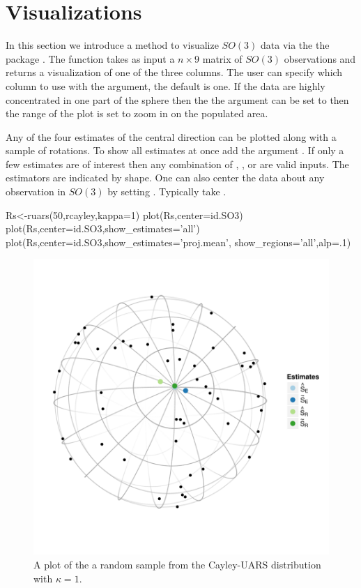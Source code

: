 \section{Visualizations}
In this section we introduce a method to visualize $SO(3)$ data via the the  package \citep{wickham2009}.  The function  takes as input a $n\times 9$ matrix of $SO(3)$ observations and returns a visualization of one of the three columns.  The user can specify which column to use with the  argument, the default is one.  If the data are highly concentrated in one part of the sphere then the the  argument can be set to  then the range of the plot is set to zoom in on the populated area. 

Any of the four estimates of the central direction can be plotted along with a sample of rotations. To show all estimates at once add the argument .  If only a few estimates are of interest then any combination of , ,  or  are valid inputs.  The estimators are indicated by shape.  One can also center the data about any observation in $SO(3)$ by setting .   Typically take .  

\begin{example}
Rs<-ruars(50,rcayley,kappa=1)
plot(Rs,center=id.SO3)
plot(Rs,center=id.SO3,show_estimates='all')
plot(Rs,center=id.SO3,show_estimates='proj.mean',
		 show_regions='all',alp=.1)
\end{example}



\begin{figure}
\centering
\includegraphics[width=.6\textwidth]{figures/eye}
\caption{\label{figure:eye1}
A plot of the a random sample from the Cayley-UARS distribution with $\kappa=1$.}
\end{figure}

